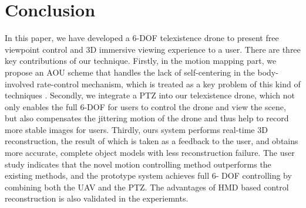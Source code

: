 \documentclass[journal]{IEEEtran}
\begin{document}


\section{Conclusion}

In this paper, we have developed a 6-DOF telexistence drone to present free 
viewpoint control and 3D immersive viewing experience to a user.
There are three key contributions of our technique. Firstly, in the 
motion mapping part, we propose an AOU scheme that handles the lack of 
self-centering in the body-involved rate-control mechanism, which is treated as 
a key problem of this kind of techniques 
\cite{Zhai:1998:UPR:307710.307728,Besancon:2017:PGF:3025453.3025890}. 
Secondly, we integrate a PTZ into our telexistence drone, which not only enables 
the full 6-DOF for users to control the drone and view the scene, but also compensates 
the jittering motion of the drone and thus help to record more stable images for users.
Thirdly, ours system performs real-time 3D reconstruction, the result of which is
taken as a feedback to the user, and obtains more accurate, complete object models with 
less reconstruction failure. The user
study indicates that the novel motion controlling method outperforms
the existing methods, and the prototype system achieves full 6-
DOF controlling by combining
both the UAV and the PTZ. The advantages of HMD based control reconstruction is also 
validated in the experiemnts.
\end{document}
